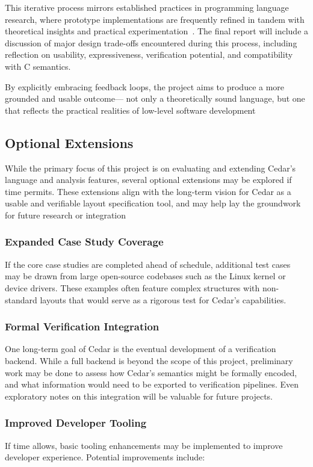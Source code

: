 \documentclass[12pt]{article}
\begin{document}
This iterative process mirrors established practices in programming language
research, where prototype implementations are frequently refined in tandem with
theoretical insights and practical
experimentation~\autocite{incremental_development,acm_programming_language_dev}.
 The final report will
include a discussion of major design trade-offs encountered during this process,
including reflection on usability, expressiveness, verification potential,
and compatibility with C semantics.

By explicitly embracing feedback loops, the project aims to produce a more
grounded and usable outcome--- not only a theoretically sound language, but one
that reflects the practical realities of low-level software development
\subsection{Optional Extensions}
While the primary focus of this project is on evaluating and extending Cedar's
language and analysis features, several optional extensions may be explored if
time permits. These extensions align with the long-term vision for Cedar as a
usable and verifiable layout specification tool, and may help lay the
groundwork for future research or integration

\subsubsection{Expanded Case Study Coverage}
If the core case studies are completed ahead of schedule, additional test cases
may be drawn from large open-source codebases such as the Linux kernel or
device drivers. These examples often feature complex structures with
non-standard layouts that would serve as a rigorous test for Cedar's
capabilities.

\subsubsection{Formal Verification Integration}
One long-term goal of Cedar is the eventual development of a verification
backend. While a full backend is beyond the scope of this project,
preliminary work may be done to assess how Cedar's semantics might be formally
encoded, and what information would need to be exported to verification
pipelines. Even exploratory notes on this integration will be valuable for
future projects.

\subsubsection{Improved Developer Tooling}
If time allows, basic tooling enhancements may be implemented to improve
developer experience. Potential improvements include:
\end{document}
